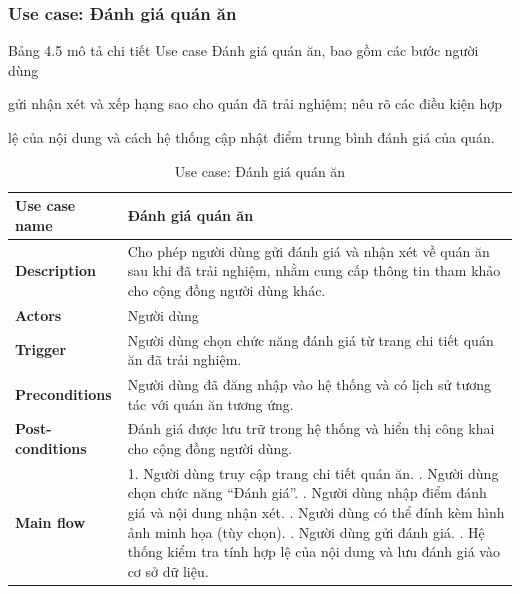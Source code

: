 
\subsubsection{Use case: Đánh giá quán ăn }

Bảng 4.5 mô tả chi tiết Use case Đánh giá quán ăn, bao gồm các bước người dùng

gửi nhận xét và xếp hạng sao cho quán đã trải nghiệm; nêu rõ các điều kiện hợp

lệ của nội dung và cách hệ thống cập nhật điểm trung bình đánh giá của quán.


\begingroup
\renewcommand{\arraystretch}{1.25}
\begin{longtable}{|p{4cm}|p{10cm}|}
\caption{Use case: Đánh giá quán ăn} \\
\endfirsthead

\endhead

\endfoot

\endlastfoot

\hline

\textbf{Use case name} &
Đánh giá quán ăn \\
\hline

\textbf{Description} &
Cho phép người dùng gửi đánh giá và nhận xét về quán ăn sau khi đã trải nghiệm, nhằm cung cấp thông tin tham khảo cho cộng đồng người dùng khác. \\
\hline

\textbf{Actors} &
Người dùng \\
\hline

\textbf{Trigger} &
Người dùng chọn chức năng đánh giá từ trang chi tiết quán ăn đã trải nghiệm. \\
\hline

\textbf{Preconditions} &
Người dùng đã đăng nhập vào hệ thống và có lịch sử tương tác với quán ăn tương ứng. \\
\hline

\textbf{Post-conditions} &
Đánh giá được lưu trữ trong hệ thống và hiển thị công khai cho cộng đồng người dùng. \\
\hline

\textbf{Main flow} &
1. Người dùng truy cập trang chi tiết quán ăn. \newline 2. Người dùng chọn chức năng ``Đánh giá''. \newline 3. Người dùng nhập điểm đánh giá và nội dung nhận xét. \newline 4. Người dùng có thể đính kèm hình ảnh minh họa (tùy chọn). \newline 5. Người dùng gửi đánh giá. \newline 6. Hệ thống kiểm tra tính hợp lệ của nội dung và lưu đánh giá vào cơ sở dữ liệu. \\
\hline


\end{longtable}
